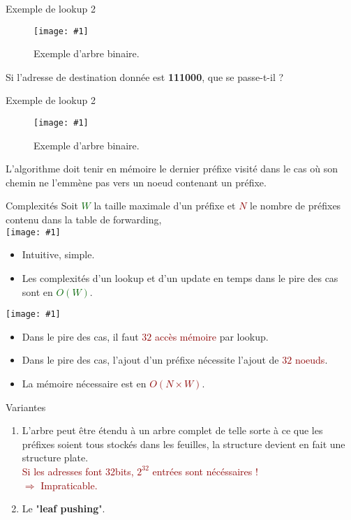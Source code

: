 \documentclass{beamer}
\newcommand{\imageR}[2]{\texttt{[image: \#1]}}
\newcommand{\cerm}[1]{\textcolor{maintitle}{#1}}
\newcommand{\gre}[1]{\textcolor{darkgreen}{#1}}
\newcommand{\red}[1]{\textcolor{darkred}{#1}}
\begin{document}
\begin{frame}{Exemple de lookup 2}

\begin{figure}
	\begin{center}
	\imageR{CN_002.png}{100}
	\caption{Exemple d'arbre binaire.}
	\end{center}	
\end{figure}

Si l'adresse de destination donnée est \textbf{111000}, que se passe-t-il ?

\end{frame}

\begin{frame}{Exemple de lookup 2}

\begin{figure}
	\begin{center}
	\imageR{CN_004.png}{100}
	\caption{Exemple d'arbre binaire.}
	\end{center}	
\end{figure}

L'algorithme doit tenir en mémoire le dernier préfixe visité dans le cas où son chemin ne l'emmène pas vers un noeud contenant un 
préfixe.

\end{frame}

\begin{frame}{Complexités}
Soit \gre{$W$} la taille maximale d'un préfixe et \red{$N$} le nombre de préfixes contenu dans la table de forwarding, \\
\imageR{good.png}{15}
\begin{itemize}
\item Intuitive, simple.
\item Les complexités d'un \cerm{lookup} et d'un \cerm{update} en temps dans le pire des cas sont en \gre{$O(W)$}. \\
\end{itemize}
\imageR{bad.png}{15}
\begin{itemize}
\item Dans le pire des cas, il faut \red{$32$ accès mémoire} par lookup.
\item Dans le pire des cas, l'ajout d'un préfixe nécessite l'ajout de \red{$32$ noeuds}.
\item La mémoire nécessaire est en \red{$O(N\times W)$}.
\end{itemize}
\end{frame}

\begin{frame}{Variantes}
\begin{enumerate}
\item L'arbre peut être étendu à un arbre complet de telle sorte à ce que les préfixes soient tous stockés dans les feuilles, la 
structure devient en fait une structure plate. \\ \red{Si les adresses font 32bits, $2^{32}$ entrées sont 
nécéssaires ! \\ $\Rightarrow$ Impraticable.}
\item Le "\cerm{\textbf{leaf pushing}}".
\end{enumerate}
\end{frame}
\end{document}
